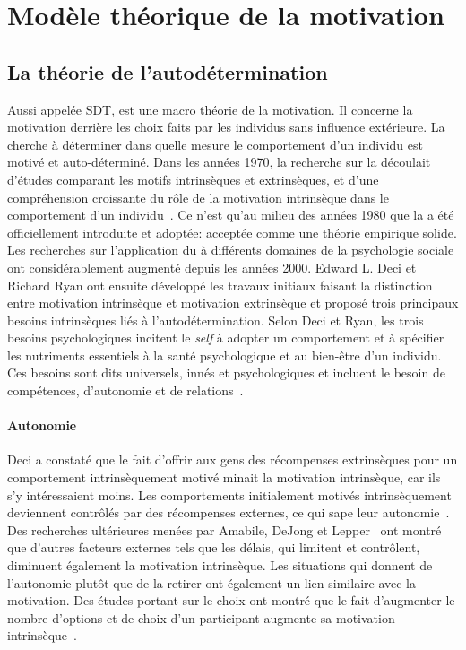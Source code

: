 \section{Modèle théorique de la motivation}
    \subsection{La théorie de l'autodétermination}\label{sec:SDT}
        Aussi appelée \glsdesc{SDT}, est une macro théorie de la motivation.
        Il concerne la motivation derrière les choix faits par les individus sans influence extérieure. La  cherche à déterminer dans quelle mesure le comportement d'un individu est motivé et auto-déterminé. 
        Dans les années 1970, la recherche sur la  découlait d'études comparant les motifs intrinsèques et extrinsèques, et d'une compréhension croissante du rôle de la motivation intrinsèque dans le comportement d'un individu~. Ce n'est qu'au milieu des années 1980 que la  a été officiellement introduite et adoptée: acceptée comme une théorie empirique solide. Les recherches sur l'application du  à différents domaines de la psychologie sociale ont considérablement augmenté depuis les années 2000. 
        Edward L. Deci et Richard Ryan ont ensuite développé les travaux initiaux faisant la distinction entre motivation intrinsèque et motivation extrinsèque et proposé trois principaux besoins intrinsèques liés à l'autodétermination. Selon Deci et Ryan, les trois besoins psychologiques incitent le \textit{self} à adopter un comportement et à spécifier les nutriments essentiels à la santé psychologique et au bien-être d'un individu. Ces besoins sont dits universels, innés et psychologiques et incluent le besoin de compétences, d'autonomie et de relations~.
        \paragraph{Autonomie}\nocite{decharms1968measuring}
            Deci a constaté que le fait d'offrir aux gens des récompenses extrinsèques pour un comportement intrinsèquement motivé minait la motivation intrinsèque, car ils s'y intéressaient moins. Les comportements initialement motivés intrinsèquement deviennent contrôlés par des récompenses externes, ce qui sape leur autonomie~.
            Des recherches ultérieures menées par Amabile, DeJong et Lepper~ ont montré que d'autres facteurs externes tels que les délais, qui limitent et contrôlent, diminuent également la motivation intrinsèque.
            Les situations qui donnent de l’autonomie plutôt que de la retirer ont également un lien similaire avec la motivation. Des études portant sur le choix ont montré que le fait d'augmenter le nombre d'options et de choix d'un participant augmente sa motivation intrinsèque~.
